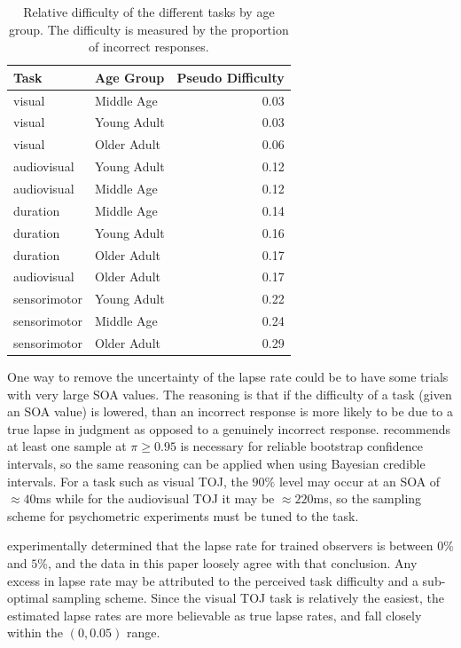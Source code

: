 \documentclass[11pt, oneside, openany]{scrbook}
\begin{document}
\begin{table}[!h]

\caption{\label{tab:ch060-Orange-Tigerfish}Relative difficulty of the different tasks by age group. The difficulty is measured by the proportion of incorrect responses.}
\centering
\begin{tabular}[t]{l|l|r}
\hline
Task & Age Group & Pseudo Difficulty\\
\hline
visual & Middle Age & 0.03\\
\hline
visual & Young Adult & 0.03\\
\hline
visual & Older Adult & 0.06\\
\hline
audiovisual & Young Adult & 0.12\\
\hline
audiovisual & Middle Age & 0.12\\
\hline
duration & Middle Age & 0.14\\
\hline
duration & Young Adult & 0.16\\
\hline
duration & Older Adult & 0.17\\
\hline
audiovisual & Older Adult & 0.17\\
\hline
sensorimotor & Young Adult & 0.22\\
\hline
sensorimotor & Middle Age & 0.24\\
\hline
sensorimotor & Older Adult & 0.29\\
\hline
\end{tabular}
\end{table}

One way to remove the uncertainty of the lapse rate could be to have some trials with very large SOA values. The reasoning is that if the difficulty of a task (given an SOA value) is lowered, than an incorrect response is more likely to be due to a true lapse in judgment as opposed to a genuinely incorrect response. \citet{wichmann2001b} recommends at least one sample at \(\pi \ge 0.95\) is necessary for reliable bootstrap confidence intervals, so the same reasoning can be applied when using Bayesian credible intervals. For a task such as visual TOJ, the \(90\%\) level may occur at an SOA of \(\approx 40\)ms while for the audiovisual TOJ it may be \(\approx 220\)ms, so the sampling scheme for psychometric experiments must be tuned to the task.

\citet{wichmann2001a} experimentally determined that the lapse rate for trained observers is between \(0\%\) and \(5\%\), and the data in this paper loosely agree with that conclusion. Any excess in lapse rate may be attributed to the perceived task difficulty and a sub-optimal sampling scheme. Since the visual TOJ task is relatively the easiest, the estimated lapse rates are more believable as true lapse rates, and fall closely within the \((0, 0.05)\) range.
\end{document}
